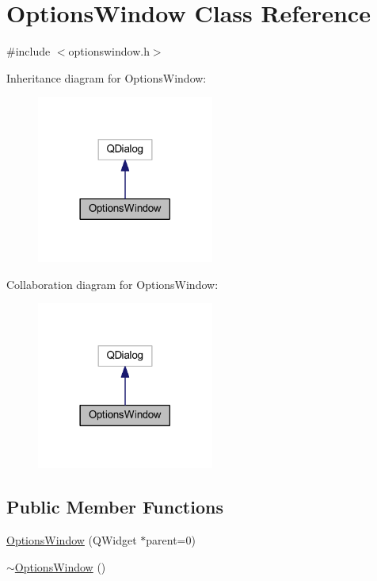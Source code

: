 \hypertarget{class_options_window}{}\section{Options\+Window Class Reference}
\label{class_options_window}


{\ttfamily \#include $<$optionswindow.\+h$>$}



Inheritance diagram for Options\+Window\+:\nopagebreak
\begin{figure}[H]
\begin{center}
\leavevmode
\includegraphics[width=165pt]{d3/d77/class_options_window__inherit__graph}
\end{center}
\end{figure}


Collaboration diagram for Options\+Window\+:\nopagebreak
\begin{figure}[H]
\begin{center}
\leavevmode
\includegraphics[width=165pt]{dd/d04/class_options_window__coll__graph}
\end{center}
\end{figure}
\subsection*{Public Member Functions}
\begin{DoxyCompactItemize}
\item 
\hyperlink{class_options_window_ac7ba16f211c07e2114015407c722840b}{Options\+Window} (Q\+Widget $\ast$parent=0)
\item 
\hyperlink{class_options_window_a034c885fe8bb4416e732a9571d14a6b4}{$\sim$\+Options\+Window} ()
\end{DoxyCompactItemize}
